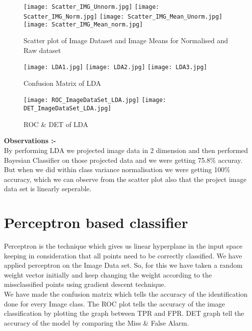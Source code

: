 \documentclass[12pt]{report}
\begin{document}
\begin{figure}[H]
		\texttt{[image: Scatter\_IMG\_Unnorm.jpg]}
		\texttt{[image: Scatter\_IMG\_Norm.jpg]}
		\texttt{[image: Scatter\_IMG\_Mean\_Unorm.jpg]}
		\texttt{[image: Scatter\_IMG\_Mean\_norm.jpg]}
	\caption{Scatter plot of Image Dataset and Image Means for Normalised and Raw dataset}
\end{figure}


\begin{figure}[H]
		\texttt{[image: LDA1.jpg]}
		\texttt{[image: LDA2.jpg]}
		\texttt{[image: LDA3.jpg]}
	\caption{Confusion Matrix of LDA}
\end{figure}



\begin{figure}[H]
	
	\texttt{[image: ROC\_ImageDataSet\_LDA.jpg]}
	\texttt{[image: DET\_ImageDataSet\_LDA.jpg]}
	\caption{ROC \& DET  of LDA }
\end{figure}


\noindent
{\bfseries Observations :-}\\
By performing LDA we projected image data in 2 dimension and then performed Bayesian Classifier on those projected data and we were getting 75.8$ \% $ accuray. But when we did within class variance normalisation we were getting 100$ \% $ accuracy, which we can observe from the scatter plot also that the project image data set is linearly seperable.


\section{Perceptron based classifier}
Perceptron is the technique which gives us linear hyperplane in the input space keeping in consideration that all points need to be correctly classified. We have applied perceptron on the Image Data set. So, for this we have taken a random weight vector initially and keep changing the weight according to the missclassified points using gradient descent technique. \\

\noindent
We have made the confusion matrix which tells the accuracy of the identification done for every Image class. The ROC plot tells the accuracy of the image classification by plotting the graph between TPR and FPR. DET graph tell the accuracy of the model by comparing the Miss \& False Alarm.
\end{document}
